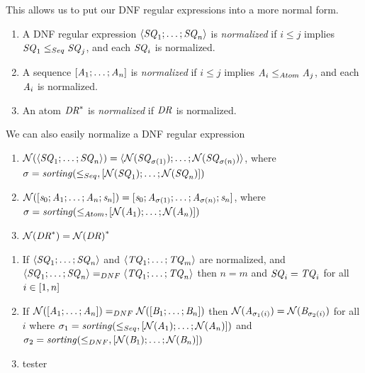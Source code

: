 \documentclass[numbers]{sigplanconf}
\begin{document}
This allows us to put our DNF regular expressions into a more normal form.

\begin{definition}
  \begin{enumerate}
  \item A DNF regular expression $\langle\mathit{SQ}_1;\ldots;\mathit{SQ}_n\rangle$ is
    \textit{normalized} if $i \leq j$ implies $\mathit{SQ}_1\leq_{Seq}\mathit{SQ}_j$,
    and each $\mathit{SQ}_i$ is normalized.
  \item A sequence $[\mathit{A}_1;\ldots;\mathit{A}_n]$ is \textit{normalized}
    if $i \leq j$ implies $\mathit{A}_i\leq_{Atom}\mathit{A}_j$,
    and each $\mathit{A}_i$ is normalized.
  \item An atom ${\mathit{DR}}^*$ is \textit{normalized} if
    $\mathit{DR}$ is normalized.
  \end{enumerate}
\end{definition}

We can also easily normalize a DNF regular expression

\begin{definition}
  \begin{enumerate}
  \item $\mathcal{N}(\langle\mathit{SQ}_1;\ldots;\mathit{SQ}_n\rangle) =
    \langle\mathcal{N}(\mathit{SQ}_{\sigma(1)});\ldots;\mathcal{N}(\mathit{SQ}_{\sigma(n)})\rangle$,
    where
    $\sigma=\mathit{sorting}(\leq_{Seq},[ \mathcal{N}(\mathit{SQ}_1);\ldots;\mathcal{N}(\mathit{SQ}_n) ])$
  \item $\mathcal{N}([\mathit{s}_0;\mathit{A}_1;\ldots;\mathit{A}_n;\mathit{s}_n]) =
    [\mathit{s}_0;\mathit{A}_{\sigma(1)};\ldots;\mathit{A}_{\sigma(n)};\mathit{s}_n]$,
    where
    $\sigma=\mathit{sorting}(\leq_{Atom},[ \mathcal{N}(\mathit{A}_1);\ldots;\mathcal{N}(\mathit{A}_n) ])$
  \item $\mathcal{N}({\mathit{DR}}^*)={\mathcal{N}(\mathit{DR})}^*$
  \end{enumerate}
\end{definition}

\begin{theorem}
  \begin{enumerate}
  \item
    If $\langle\mathit{SQ}_1;\ldots;\mathit{SQ}_n\rangle$ and
    $\langle\mathit{TQ}_1;\ldots;\mathit{TQ}_m\rangle$ are normalized, and
    $\langle\mathit{SQ}_1;\ldots;\mathit{SQ}_n\rangle=_{DNF}\langle\mathit{TQ}_1;\ldots;\mathit{TQ}_n\rangle$
    then
    $n=m$ and
    $\mathit{SQ}_i = \mathit{TQ}_i$ for all $i\in[1,n]$
  \item
    If $\mathcal{N}([\mathit{A}_1;\ldots;\mathit{A}_n]) =_{DNF}
    \mathcal{N}([\mathit{B}_1;\ldots;\mathit{B}_n])$ then
    $\mathcal{N}(\mathit{A}_{\sigma_1(i)}) =
    \mathcal{N}(\mathit{B}_{\sigma_2(i)})$ for all $i$
    where $\sigma_1 =
    \mathit{sorting}(\leq_{Seq},[ \mathcal{N}(\mathit{A}_1);\ldots;\mathcal{N}(\mathit{A}_n) ])$
    and $\sigma_2 =
    \mathit{sorting}(\leq_{DNF},[ \mathcal{N}(\mathit{B}_1);\ldots;\mathcal{N}(\mathit{B}_n) ])$
  \item
    tester
  \end{enumerate}
\end{theorem}
\end{document}
